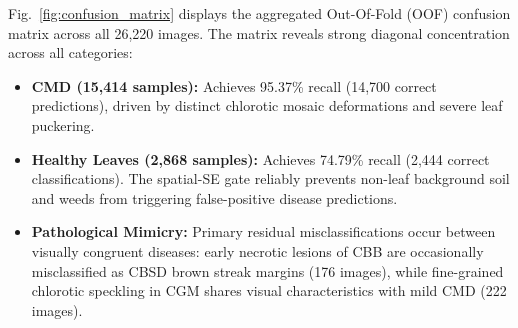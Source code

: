 \documentclass[conference]{IEEEtran}
\begin{document}
Fig.~\ref{fig:confusion_matrix} displays the aggregated Out-Of-Fold (OOF) confusion matrix across all 26,220 images. The matrix reveals strong diagonal concentration across all categories:
\begin{itemize}
    \item \textbf{CMD (15,414 samples):} Achieves 95.37\% recall (14,700 correct predictions), driven by distinct chlorotic mosaic deformations and severe leaf puckering.
    \item \textbf{Healthy Leaves (2,868 samples):} Achieves 74.79\% recall (2,444 correct classifications). The spatial-SE gate reliably prevents non-leaf background soil and weeds from triggering false-positive disease predictions.
    \item \textbf{Pathological Mimicry:} Primary residual misclassifications occur between visually congruent diseases: early necrotic lesions of CBB are occasionally misclassified as CBSD brown streak margins (176 images), while fine-grained chlorotic speckling in CGM shares visual characteristics with mild CMD (222 images).
\end{itemize}
\end{document}
